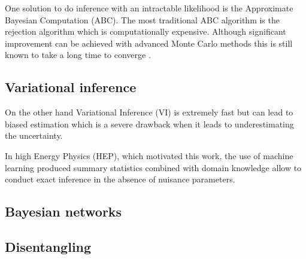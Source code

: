 
One solution to do inference with an intractable likelihood is the Approximate Bayesian Computation (ABC).
The most traditional ABC algorithm is the rejection algorithm which is computationally expensive.
Although significant improvement can be achieved with advanced Monte Carlo methods this is still known to take a long time to converge \needcite.






\subsection{Variational inference} %
\label{sub:variational_inference}


On the other hand Variational Inference (VI) is extremely fast but can lead to biased estimation which is a severe drawback when it leads to underestimating the uncertainty.

In high Energy Physics (HEP), which motivated this work, the use of machine learning produced summary statistics combined with domain knowledge allow to conduct exact inference in the absence of nuisance parameters.









\subsection{Bayesian networks} %
\label{sub:bayesian_networks}








\subsection{Disentangling} %
\label{sub:disentangling}

